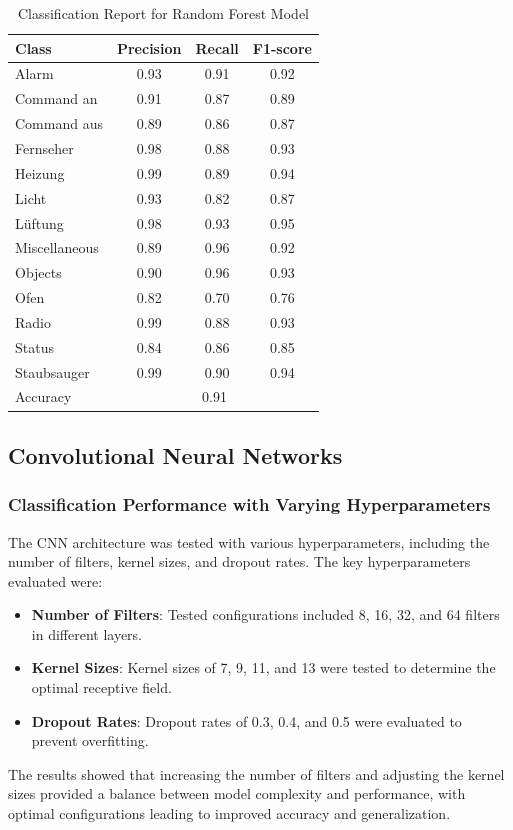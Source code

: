 \begin{table}
  \caption{Classification Report for Random Forest Model}
  \label{tab:classification_report}
  \centering
  \begin{tabular}{lccc}
    \toprule
    Class        & Precision & Recall & F1-score \\
    \midrule
    Alarm        & 0.93 & 0.91 & 0.92 \\
    Command an   & 0.91 & 0.87 & 0.89 \\
    Command aus  & 0.89 & 0.86 & 0.87 \\
    Fernseher    & 0.98 & 0.88 & 0.93 \\
    Heizung      & 0.99 & 0.89 & 0.94 \\
    Licht        & 0.93 & 0.82 & 0.87 \\
    Lüftung      & 0.98 & 0.93 & 0.95 \\
    Miscellaneous & 0.89 & 0.96 & 0.92 \\
    Objects      & 0.90 & 0.96 & 0.93 \\
    Ofen         & 0.82 & 0.70 & 0.76 \\
    Radio        & 0.99 & 0.88 & 0.93 \\
    Status       & 0.84 & 0.86 & 0.85 \\
    Staubsauger  & 0.99 & 0.90 & 0.94 \\
    \midrule
    Accuracy     & \multicolumn{3}{c}{0.91} \\
    \bottomrule
  \end{tabular}
\end{table}

\subsection{Convolutional Neural Networks}
\subsubsection{Classification Performance with Varying Hyperparameters}
The CNN architecture was tested with various hyperparameters, including the number of filters, kernel sizes, and dropout rates. The key hyperparameters evaluated were:
\begin{itemize}
    \item \textbf{Number of Filters}: Tested configurations included 8, 16, 32, and 64 filters in different layers.
    \item \textbf{Kernel Sizes}: Kernel sizes of 7, 9, 11, and 13 were tested to determine the optimal receptive field.
    \item \textbf{Dropout Rates}: Dropout rates of 0.3, 0.4, and 0.5 were evaluated to prevent overfitting.
\end{itemize}
The results showed that increasing the number of filters and adjusting the kernel sizes provided a balance between model complexity and performance, with optimal configurations leading to improved accuracy and generalization.

